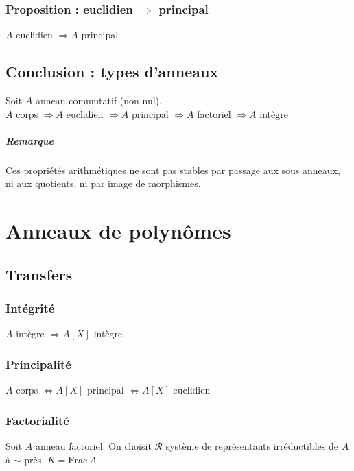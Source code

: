 \documentclass[reqno,a4paper,10pt]{report}
\newcommand{\Frac}{\mathrm{Frac}\:} %
\newcommand{\so}{\Rightarrow}
\newcommand{\pfootnote}[1]{\up{(}\footnote{#1}\up{)}} %
\begin{document}
\subsection{Proposition : euclidien $\so$ principal}
$A$ euclidien $\so A$ principal
\begin{comment}
  \pfootnote{Preuve 02/12/09 p2 verso}
\end{comment}

\section{Conclusion : types d'anneaux}
Soit $A$ anneau commutatif (non nul).\\
$A$ corps $\so A$ euclidien $\so A$ principal $\so A$ factoriel $\so A$ intègre

\paragraph{Remarque} Ces propriétés arithmétiques ne sont pas stables par
passage aux sous anneaux, ni aux quotients, ni par image de morphismes.

\chapter{Anneaux de polynômes}

\section{Transfers}
\subsection{Intégrité}
$A$ intègre $\so A[X]$ intègre

\subsection{Principalité}
$A$ corps $\iff A[X]$ principal $\iff A[X]$ euclidien
\begin{comment}
  \pfootnote{Preuve 09/12/09 p1}
\end{comment}

\subsection{Factorialité}
Soit $A$ anneau factoriel. On choisit $\mathcal R$ système de représentants
irréductibles de $A$ à $\sim$ près.  $K=\Frac A$
\end{document}
